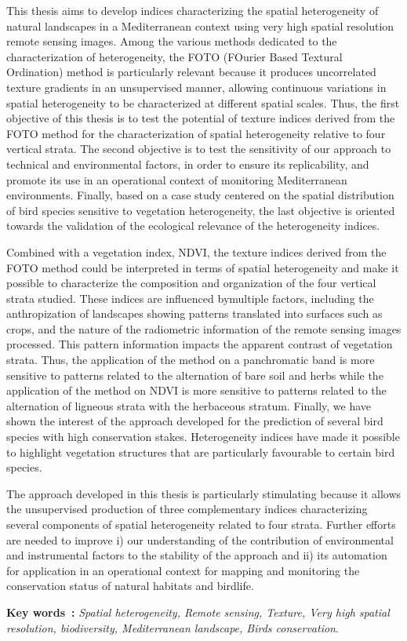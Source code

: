 This thesis aims to develop indices characterizing the spatial heterogeneity of natural landscapes in a Mediterranean context using very high spatial resolution remote sensing images. Among the various methods dedicated to the characterization of heterogeneity, the FOTO (FOurier Based Textural Ordination) method is particularly relevant because it produces uncorrelated texture gradients in an unsupervised manner, allowing continuous variations in spatial heterogeneity to be characterized at different spatial scales. Thus, the first objective of this thesis is to test the potential of texture indices derived from the FOTO method for the characterization of spatial heterogeneity relative to four vertical strata. The second objective is to test the sensitivity of our approach to technical and environmental factors, in order to ensure its replicability, and promote its use in an operational context of monitoring Mediterranean environments. Finally, based on a case study centered on the spatial distribution of bird species sensitive to vegetation heterogeneity, the last objective is oriented towards the validation of the ecological relevance of the heterogeneity indices.

Combined with a vegetation index, NDVI, the texture indices derived from the FOTO method could be interpreted in terms of spatial heterogeneity and make it possible to characterize the composition and organization of the four vertical strata studied. These indices are influenced bymultiple factors, including the anthropization of landscapes showing patterns translated into surfaces such as crops, and the nature of the radiometric information of the remote sensing images processed. This pattern information impacts the apparent contrast of vegetation strata. Thus, the application of the method on a panchromatic band is more sensitive to patterns related to the alternation of bare soil and herbs while the application of the method on NDVI is more sensitive to patterns related to the alternation of ligneous strata with the herbaceous stratum. Finally, we have shown the interest of the approach developed for the prediction of several bird species with high conservation stakes. Heterogeneity indices have made it possible to highlight vegetation structures that are particularly favourable to certain bird species.

The approach developed in this thesis is particularly stimulating because it allows the unsupervised production of three complementary indices characterizing several components of spatial heterogeneity related to four strata. Further efforts are needed to improve i) our understanding of the contribution of environmental and instrumental factors to the stability of the approach and ii) its automation for application in an operational context for mapping and monitoring the conservation status of natural habitats and birdlife.

\textbf{Key words~:}{ \it Spatial heterogeneity, Remote sensing, Texture, Very high spatial resolution, biodiversity, Mediterranean landscape, Birds conservation}.
\normalsize
\restoregeometry
\vskip 0.5cm
\noindent

